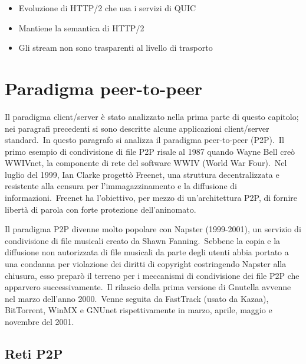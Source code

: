 \begin{itemize}
    \item Evoluzione di HTTP/2 che usa i servizi di QUIC
    \item Mantiene la semantica di HTTP/2
    \item Gli stream non sono trasparenti al livello di trasporto
\end{itemize}

\section{Paradigma peer-to-peer}

Il paradigma client/server è stato analizzato nella prima parte di questo capitolo; nei paragrafi precedenti si sono descritte alcune applicazioni client{\slash}server standard.\
In questo paragrafo si analizza il paradigma peer-to-peer (P2P).\
Il primo esempio di condivisione di file P2P risale al 1987 quando Wayne Bell creò WWIVnet, la componente di rete del software WWIV (World War Four).\
Nel luglio del 1999, Ian Clarke progettò Freenet, una struttura decentralizzata e resistente alla censura per l'immagazzinamento e la diffusione di informazioni.\
Freenet ha l'obiettivo, per mezzo di un'architettura P2P, di fornire libertà di parola con forte protezione dell'aninomato.

Il paradigma P2P divenne molto popolare con Napster (1999-2001), un servizio di condivisione di file musicali creato da Shawn Fanning.\
Sebbene la copia e la diffusione non autorizzata di file musicali da parte degli utenti abbia portato a una condanna per violazione dei diritti di copyright costringendo Napster alla chiusura, esso preparò il terreno per i meccanismi di condivisione dei file P2P che apparvero successivamente.\
Il rilascio della prima versione di Gnutella avvenne nel marzo dell'anno 2000.\
Venne seguita da FastTrack (usato da Kazaa), BitTorrent, WinMX e GNUnet rispettivamente in marzo, aprile, maggio e novembre del 2001.

\subsection{Reti P2P}


